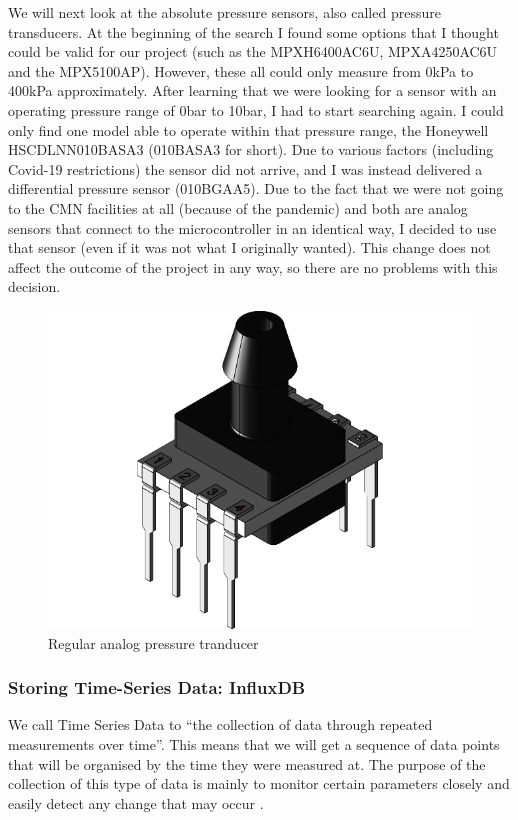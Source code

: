 \documentclass[12pt]{article}
\begin{document}
We will next look at the absolute pressure sensors, also called pressure transducers. At the beginning of the search I found some options that I thought could be valid for our project (such as the MPXH6400AC6U, MPXA4250AC6U and the MPX5100AP). However, these all could only measure from 0kPa to 400kPa approximately. After learning that we were looking for a sensor with an operating pressure range of 0bar to 10bar, I had to start searching again. I could only find one model able to operate within that pressure range, the Honeywell HSCDLNN010BASA3 (010BASA3 for short). Due to various factors (including Covid-19 restrictions) the sensor did not arrive, and I was instead delivered a differential pressure sensor (010BGAA5). Due to the fact that we were not going to the CMN facilities at all (because of the pandemic) and both are analog sensors that connect to the microcontroller in an identical way, I decided to use that sensor (even if it was not what I originally wanted). This change does not affect the outcome of the project in any way, so there are no problems with this decision.

\begin{figure}[h]
\label{fig:010BGAA5}
\includegraphics[scale=0.15]{large}
\centering
\caption{Regular analog pressure tranducer}
\end{figure}

\subsubsection{Storing Time-Series Data: InfluxDB}

We call Time Series Data to ``the collection of data through repeated measurements over time''. This means that we will get a sequence of data points that will be organised by the time they were measured at. The purpose of the collection of this type of data is mainly to monitor certain parameters closely and easily detect any change that may occur \cite{influx:time-series}.\par
\end{document}
